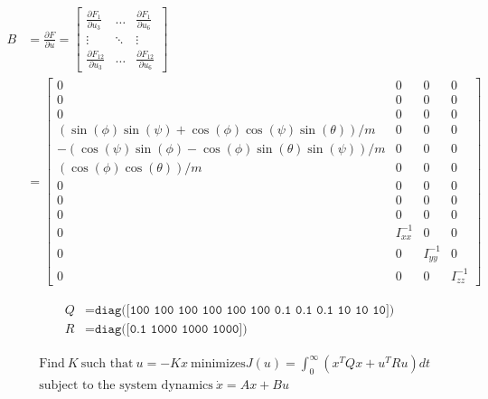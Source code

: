 \documentclass[letterpaper, paper,11pt]{AAS}	%
\begin{document}
\begin{equation}
\begin{split}
\label{eq:B}
B &= \frac{\partial F}{\partial u} = 
\begin{bmatrix} 
    \frac{\partial F_1}{\partial u_3} & \dots  & \frac{\partial F_1}{\partial u_6}\\
    \vdots & \ddots & \vdots\\
    \frac{\partial F_{12}}{\partial u_3} & \dots  & \frac{\partial F_{12}}{\partial u_6} 
\end{bmatrix}\\&=\begin{bmatrix}
         0&0&0&0\\
         0&0&0&0\\
         0&0&0&0\\
         (\sin(\phi)\sin(\psi) + \cos(\phi)\cos(\psi)\sin(\theta)) / m&0&0&0\\
         -(\cos(\psi)\sin(\phi) - \cos(\phi)\sin(\theta)\sin(\psi)) / m&0&0&0\\
         (\cos(\phi)\cos(\theta)) / m&0&0&0\\
         0&0&0&0\\
         0&0&0&0\\
         0&0&0&0\\
         0&I_{xx}^{-1}&0&0\\
         0&0&I_{yy}^{-1}&0\\
         0&0&0&I_{zz}^{-1}
\end{bmatrix}
\end{split}
\end{equation}

\begin{equation}
\label{eq:QandR}
\begin{split}
Q &= \texttt{diag([100 100 100 100 100 100 0.1 0.1 0.1 10 10 10])}\\
R &= \texttt{diag([0.1 1000 1000 1000])}
\end{split}
\end{equation}

\begin{equation}
\label{eq:LQR}
\begin{split}
&\text{Find}\  K\  \text{such that}\  u=-Kx\  \text{minimizes}
J(u)=\int_{0}^{\infty} (x^TQx+u^TRu)dt\\
&\text{subject to the system dynamics}\  \dot{x}=Ax+Bu
\end{split}
\end{equation}
\end{document}
